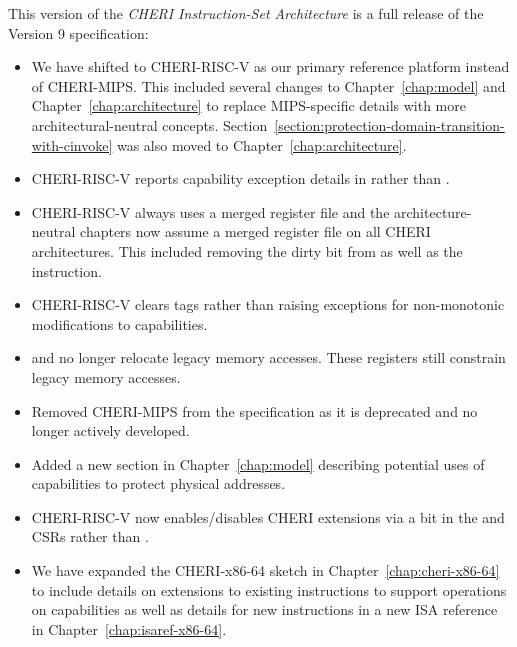 This version of the \textit{CHERI Instruction-Set Architecture} is a full
release of the Version 9 specification:

\begin{itemize}
\item We have shifted to CHERI-RISC-V as our primary reference
  platform instead of CHERI-MIPS.  This included several changes to
  Chapter~\ref{chap:model} and Chapter~\ref{chap:architecture} to
  replace MIPS-specific details with more architectural-neutral
  concepts.
  Section~\ref{section:protection-domain-transition-with-cinvoke} was
  also moved to Chapter~\ref{chap:architecture}.

\item CHERI-RISC-V reports capability exception details in \xtval{}
  rather than \xccsr{}.

\item CHERI-RISC-V always uses a merged register file and the
  architecture-neutral chapters now assume a merged register file on
  all CHERI architectures.  This included removing the dirty bit from
  \xccsr{} as well as the  instruction.

\item CHERI-RISC-V clears tags rather than raising exceptions for
  non-monotonic modifications to capabilities.

\item \DDC{} and \PCC{} no longer relocate legacy memory accesses.
  These registers still constrain legacy memory accesses.

\item Removed CHERI-MIPS from the specification as it is deprecated
  and no longer actively developed.

\item Added a new section in Chapter~\ref{chap:model} describing
  potential uses of capabilities to protect physical addresses.

\item CHERI-RISC-V now enables/disables CHERI extensions via a bit in
  the \menvcfg{} and \senvcfg{} CSRs rather than \xccsr{}.

\item We have expanded the CHERI-x86-64 sketch in
  Chapter~\ref{chap:cheri-x86-64} to include details on extensions to
  existing instructions to support operations on capabilities as well
  as details for new instructions in a new ISA reference in
  Chapter~\ref{chap:isaref-x86-64}.
\end{itemize}
